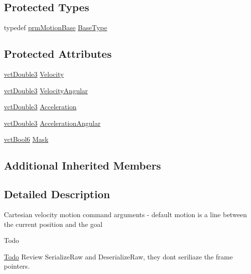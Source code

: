 \subsection*{Protected Types}
\begin{DoxyCompactItemize}
\item 
typedef \hyperlink{classprm_motion_base}{prm\+Motion\+Base} \hyperlink{classprm_velocity_cartesian_set_ade8ba9bb6ac994b5e7fd11084d3f54f1}{Base\+Type}
\end{DoxyCompactItemize}
\subsection*{Protected Attributes}
\begin{DoxyCompactItemize}
\item 
\hyperlink{vct_fixed_size_vector_types_8h_a4a89122c9d7f72c3f31fe8126e17c3af}{vct\+Double3} \hyperlink{classprm_velocity_cartesian_set_a8cc967fe13fe3167899f35394ef46dd0}{Velocity}
\item 
\hyperlink{vct_fixed_size_vector_types_8h_a4a89122c9d7f72c3f31fe8126e17c3af}{vct\+Double3} \hyperlink{classprm_velocity_cartesian_set_a9d72325c32e55acfe48be69131f34fc3}{Velocity\+Angular}
\item 
\hyperlink{vct_fixed_size_vector_types_8h_a4a89122c9d7f72c3f31fe8126e17c3af}{vct\+Double3} \hyperlink{classprm_velocity_cartesian_set_a06731c23de2a0df1e3bcb7c4a06e988f}{Acceleration}
\item 
\hyperlink{vct_fixed_size_vector_types_8h_a4a89122c9d7f72c3f31fe8126e17c3af}{vct\+Double3} \hyperlink{classprm_velocity_cartesian_set_a8a5727216f0caf109547c0cfd3ae6e43}{Acceleration\+Angular}
\item 
\hyperlink{vct_fixed_size_vector_types_8h_a1494a41869ce763813f2bf7f922b8fdd}{vct\+Bool6} \hyperlink{classprm_velocity_cartesian_set_aac00bb3d01fc051ac28f1ae32e06cfab}{Mask}
\end{DoxyCompactItemize}
\subsection*{Additional Inherited Members}


\subsection{Detailed Description}
Cartesian velocity motion command arguments -\/ default motion is a line between the current position and the goal\begin{DoxyRefDesc}{Todo}
\item[\hyperlink{todo__todo000010}{Todo}]Review Serialize\+Raw and Deserialize\+Raw, they don\textquotesingle{}t seriliaze the frame pointers. \end{DoxyRefDesc}


